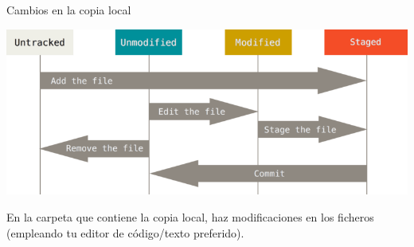 \documentclass[aspectratio=169, xcolor={usenames,svgnames,dvipsnames}]{beamer}
\begin{document}
\begin{frame}[label={sec:org045b495}]{Cambios en la copia local}
\begin{center}
\includegraphics[height=0.4\textheight]{figs/git_estados.png}
\end{center}

En la carpeta que contiene la copia local, haz \alert{modificaciones} en los ficheros (empleando tu editor de código/texto preferido).
\end{frame}
\end{document}
